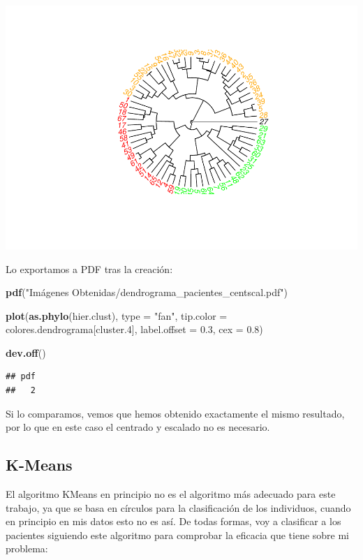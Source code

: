 \documentclass[]{article}
\newenvironment{Shaded}{\begin{snugshade}}{\end{snugshade}}
\newcommand{\KeywordTok}[1]{\textcolor[rgb]{0.13,0.29,0.53}{\textbf{#1}}}
\newcommand{\DataTypeTok}[1]{\textcolor[rgb]{0.13,0.29,0.53}{#1}}
\newcommand{\DecValTok}[1]{\textcolor[rgb]{0.00,0.00,0.81}{#1}}
\newcommand{\FloatTok}[1]{\textcolor[rgb]{0.00,0.00,0.81}{#1}}
\newcommand{\StringTok}[1]{\textcolor[rgb]{0.31,0.60,0.02}{#1}}
\newcommand{\NormalTok}[1]{#1}
\begin{document}
\includegraphics{codigo_files/figure-latex/creacion_clusters_dendrograma_centradoEscalado-1.pdf}

Lo exportamos a PDF tras la creación:

\begin{Shaded}
\begin{Highlighting}[]
\KeywordTok{pdf}\NormalTok{(}\StringTok{"Imágenes Obtenidas/dendrograma_pacientes_centscal.pdf"}\NormalTok{)}

\KeywordTok{plot}\NormalTok{(}\KeywordTok{as.phylo}\NormalTok{(hier.clust), }\DataTypeTok{type =} \StringTok{"fan"}\NormalTok{, }\DataTypeTok{tip.color =}\NormalTok{ colores.dendrograma[cluster.}\DecValTok{4}\NormalTok{], }\DataTypeTok{label.offset =} \FloatTok{0.3}\NormalTok{, }\DataTypeTok{cex =} \FloatTok{0.8}\NormalTok{)}

\KeywordTok{dev.off}\NormalTok{()}
\end{Highlighting}
\end{Shaded}

\begin{verbatim}
## pdf 
##   2
\end{verbatim}

Si lo comparamos, vemos que hemos obtenido exactamente el mismo
resultado, por lo que en este caso el centrado y escalado no es
necesario.

\subsection{K-Means}\label{k-means}

El algoritmo KMeans en principio no es el algoritmo más adecuado para
este trabajo, ya que se basa en círculos para la clasificación de los
individuos, cuando en principio en mis datos esto no es así. De todas
formas, voy a clasificar a los pacientes siguiendo este algoritmo para
comprobar la eficacia que tiene sobre mi problema:
\end{document}
